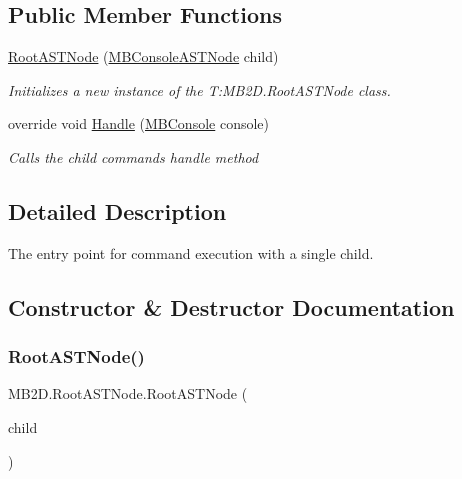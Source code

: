 \subsection*{Public Member Functions}
\begin{DoxyCompactItemize}
\item 
\hyperlink{class_m_b2_d_1_1_root_a_s_t_node_a95bcf5c31204ca61af984ddc58adff34}{Root\+A\+S\+T\+Node} (\hyperlink{class_m_b2_d_1_1_m_b_console_a_s_t_node}{M\+B\+Console\+A\+S\+T\+Node} child)
\begin{DoxyCompactList}\small\item\em Initializes a new instance of the T\+:\+M\+B2\+D.\+Root\+A\+S\+T\+Node class. \end{DoxyCompactList}\item 
override void \hyperlink{class_m_b2_d_1_1_root_a_s_t_node_a16290285c34db0660c0a8006fa182d0d}{Handle} (\hyperlink{class_m_b2_d_1_1_m_b_console}{M\+B\+Console} console)
\begin{DoxyCompactList}\small\item\em Calls the child commands handle method \end{DoxyCompactList}\end{DoxyCompactItemize}


\subsection{Detailed Description}
The entry point for command execution with a single child. 



\subsection{Constructor \& Destructor Documentation}
\hypertarget{class_m_b2_d_1_1_root_a_s_t_node_a95bcf5c31204ca61af984ddc58adff34}{}\label{class_m_b2_d_1_1_root_a_s_t_node_a95bcf5c31204ca61af984ddc58adff34} 
\subsubsection{\texorpdfstring{Root\+A\+S\+T\+Node()}{RootASTNode()}}
{\footnotesize\ttfamily M\+B2\+D.\+Root\+A\+S\+T\+Node.\+Root\+A\+S\+T\+Node (\begin{DoxyParamCaption}\item[{\hyperlink{class_m_b2_d_1_1_m_b_console_a_s_t_node}{M\+B\+Console\+A\+S\+T\+Node}}]{child }\end{DoxyParamCaption})\hspace{0.3cm}{\ttfamily [inline]}}



